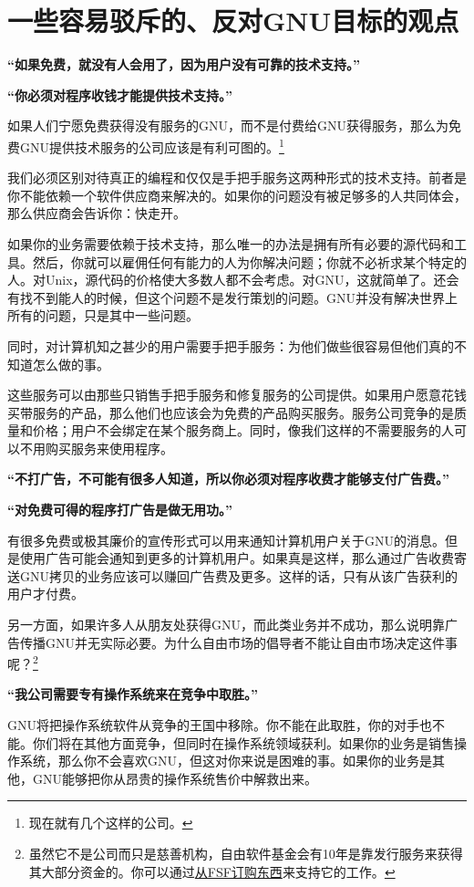 \section{一些容易驳斥的、反对GNU目标的观点}
\bf“如果免费，就没有人会用了，因为用户没有可靠的技术支持。”\normalall\par
\bf“你必须对程序收钱才能提供技术支持。”\normalall\par
如果人们宁愿免费获得没有服务的GNU，而不是付费给GNU获得服务，那么为免费GNU提供技术服务的公司应该是有利可图的。\footnote{现在就有几个这样的公司。}\par
我们必须区别对待真正的编程和仅仅是手把手服务这两种形式的技术支持。前者是你不能依赖一个软件供应商来解决的。如果你的问题没有被足够多的人共同体会，那么供应商会告诉你：快走开。\par
如果你的业务需要依赖于技术支持，那么唯一的办法是拥有所有必要的源代码和工具。然后，你就可以雇佣任何有能力的人为你解决问题；你就不必祈求某个特定的人。对Unix，源代码的价格使大多数人都不会考虑。对GNU，这就简单了。还会有找不到能人的时候，但这个问题不是发行策划的问题。GNU并没有解决世界上所有的问题，只是其中一些问题。\par
同时，对计算机知之甚少的用户需要手把手服务：为他们做些很容易但他们真的不知道怎么做的事。\par
这些服务可以由那些只销售手把手服务和修复服务的公司提供。如果用户愿意花钱买带服务的产品，那么他们也应该会为免费的产品购买服务。服务公司竞争的是质量和价格；用户不会绑定在某个服务商上。同时，像我们这样的不需要服务的人可以不用购买服务来使用程序。\par
\bf“不打广告，不可能有很多人知道，所以你必须对程序收费才能够支付广告费。”\normalall\par
\bf“对免费可得的程序打广告是做无用功。”\normalall\par
有很多免费或极其廉价的宣传形式可以用来通知计算机用户关于GNU的消息。但是使用广告可能会通知到更多的计算机用户。如果真是这样，那么通过广告收费寄送GNU拷贝的业务应该可以赚回广告费及更多。这样的话，只有从该广告获利的用户才付费。\par
另一方面，如果许多人从朋友处获得GNU，而此类业务并不成功，那么说明靠广告传播GNU并无实际必要。为什么自由市场的倡导者不能让自由市场决定这件事呢？\footnote{虽然它不是公司而只是慈善机构，自由软件基金会有10年是靠发行服务来获得其大部分资金的。你可以通过\href{http://www.gnu.org/order/order.html}{从FSF订购东西}来支持它的工作。 }\par
\bf“我公司需要专有操作系统来在竞争中取胜。”\normalall\par
GNU将把操作系统软件从竞争的王国中移除。你不能在此取胜，你的对手也不能。你们将在其他方面竞争，但同时在操作系统领域获利。如果你的业务是销售操作系统，那么你不会喜欢GNU，但这对你来说是困难的事。如果你的业务是其他，GNU能够把你从昂贵的操作系统售价中解救出来。\par
